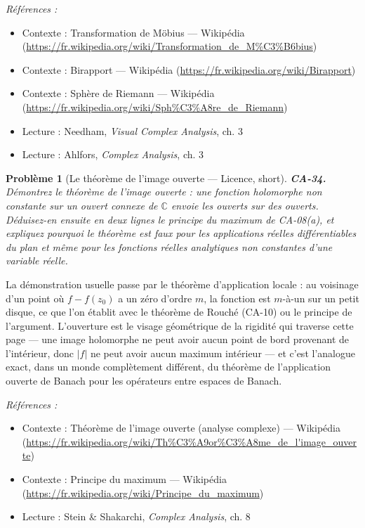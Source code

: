 \documentclass[11pt]{article}
\newtheorem{problem}{Problème}
\newenvironment{refs}{\par\small\noindent\emph{Références :}\begin{itemize}\setlength\itemsep{0pt}}{\end{itemize}\normalsize}
\begin{document}
\begin{refs}
\item Contexte : Transformation de Möbius --- Wikipédia (\url{https://fr.wikipedia.org/wiki/Transformation_de_M%C3%B6bius})
\item Contexte : Birapport --- Wikipédia (\url{https://fr.wikipedia.org/wiki/Birapport})
\item Contexte : Sphère de Riemann --- Wikipédia (\url{https://fr.wikipedia.org/wiki/Sph%C3%A8re_de_Riemann})
\item Lecture : Needham, \textit{Visual Complex Analysis}, ch. 3
\item Lecture : Ahlfors, \textit{Complex Analysis}, ch. 3
\end{refs}

\bigskip

\begin{problem}[{Le théorème de l'image ouverte --- Licence, short}]
\textbf{CA-34.} Démontrez le théorème de l'image ouverte : une fonction
holomorphe non constante sur un ouvert connexe de $ \mathbb{C} $ envoie les ouverts sur des
ouverts. Déduisez-en ensuite en deux lignes le principe du maximum de CA-08(a), et expliquez
pourquoi le théorème est faux pour les applications réelles différentiables du plan et même pour les
fonctions réelles analytiques non constantes d'une variable réelle.
\end{problem}

\noindent La démonstration usuelle passe par le théorème d'application locale : au
voisinage d'un point où $ f - f(z_0) $ a un zéro d'ordre $ m $, la fonction est $ m $-à-un sur
un petit disque, ce que l'on établit avec le théorème de Rouché (CA-10) ou le principe de
l'argument. L'ouverture est le visage géométrique de la rigidité qui traverse cette page --- une image
holomorphe ne peut avoir aucun point de bord provenant de l'intérieur, donc $ |f| $ ne peut avoir
aucun maximum intérieur --- et c'est l'analogue exact, dans un monde complètement différent, du
théorème de l'application ouverte de Banach pour les opérateurs entre espaces de Banach.

\begin{refs}
\item Contexte : Théorème de l'image ouverte (analyse complexe) --- Wikipédia (\url{https://fr.wikipedia.org/wiki/Th%C3%A9or%C3%A8me_de_l'image_ouverte})
\item Contexte : Principe du maximum --- Wikipédia (\url{https://fr.wikipedia.org/wiki/Principe_du_maximum})
\item Lecture : Stein \& Shakarchi, \textit{Complex Analysis}, ch. 8
\end{refs}
\end{document}
